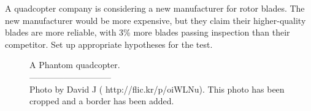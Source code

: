 \begin{exercisewrap}
\begin{nexercise}
\label{carWheelBladeManufacturer}%
A quadcopter company is considering a new manufacturer
for rotor blades.
The new manufacturer would be more expensive,
but they claim
their higher-quality blades are more reliable,
with 3\% more blades passing inspection than their
competitor.
Set up appropriate hypotheses for the test.\footnotemark
\end{nexercise}
\end{exercisewrap}

\setlength{\captionwidth}{85mm}

\begin{figure}[h]
\centering
{}
\caption{A Phantom quadcopter.\vspace{-1mm} \\
   -----------------------------\vspace{-2mm}\\
   {\footnotesize Photo by David J
   (
       {http://flic.kr/p/oiWLNu}).
   This photo has been cropped and a border has been added.}}
\label{quadcopter_david_j}
\end{figure}

\setlength{\captionwidth}{\mycaptionwidth}

\D{\newpage}


